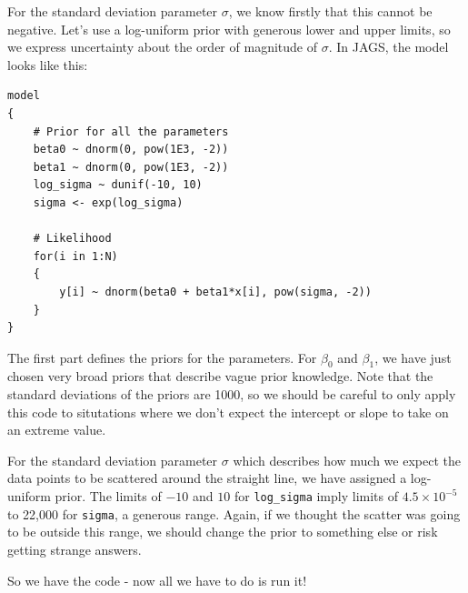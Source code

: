 For the standard deviation parameter $\sigma$, we know firstly that this cannot
be negative. Let's use a log-uniform prior with generous lower and upper limits,
so we express uncertainty about the order of magnitude of $\sigma$.
In JAGS, the model looks like this:
\begin{framed}
\begin{verbatim}
model
{
    # Prior for all the parameters
    beta0 ~ dnorm(0, pow(1E3, -2))
    beta1 ~ dnorm(0, pow(1E3, -2))
    log_sigma ~ dunif(-10, 10)
    sigma <- exp(log_sigma)

    # Likelihood
    for(i in 1:N)
    {
        y[i] ~ dnorm(beta0 + beta1*x[i], pow(sigma, -2))
    }
}
\end{verbatim}
\end{framed}
The first part defines the priors for the parameters. For $\beta_0$ and $\beta_1$,
we have just chosen very broad priors that describe vague prior knowledge. Note
that the standard deviations of the priors are 1000, so we should be careful
to only apply this code to situtations where we don't expect the intercept or
slope to take on an extreme value.

For the standard deviation parameter $\sigma$ which describes how much we
expect the data points to be scattered around the straight line, we have assigned
a log-uniform prior. The limits of $-10$ and $10$ for {\tt log\_sigma} imply
limits of $4.5 \times 10^{-5}$ to 22,000 for {\tt sigma}, a generous range.
Again, if we thought the scatter
was going to be outside this range, we should change the prior to something
else or risk getting strange answers.

So we have the code - now all we have to do is run it!

